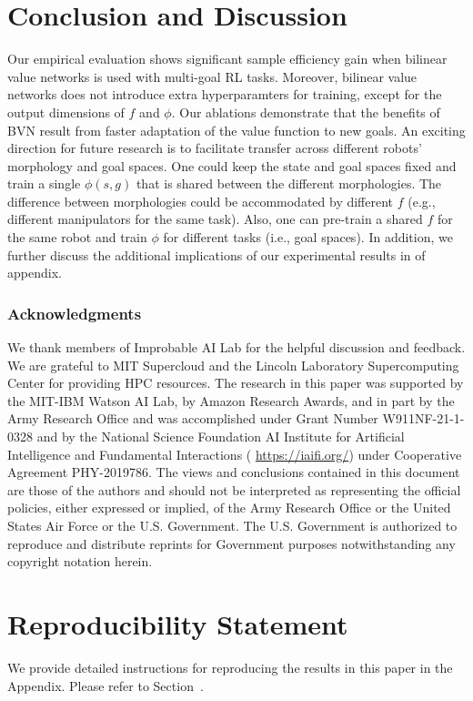 \documentclass[dvipsnames]{article} %
\theoremstyle{definition}
\theoremstyle{remark}
\begin{document}
\section{Conclusion and Discussion}

Our empirical evaluation shows significant sample efficiency gain when bilinear value networks is used with multi-goal RL tasks. Moreover, bilinear value networks does not introduce extra hyperparamters for training, except for the output dimensions of $f$ and $\phi$. Our ablations demonstrate that the benefits of BVN result from faster adaptation of the value function to new goals. An exciting direction for future research  is to facilitate transfer across different robots' morphology and goal spaces. One could keep the state and goal spaces fixed and train a single \(\phi(s, g)\) that is shared between the different morphologies. The difference between morphologies could be accommodated by different $f$ (e.g., different manipulators for the same task). Also, one can pre-train a shared $f$ for the same robot and train $\phi$ for different tasks (i.e., goal spaces). In addition, we further discuss the additional implications of our experimental results in  of appendix.



\subsubsection*{Acknowledgments}
We thank members of Improbable AI Lab for the helpful discussion and feedback. We are grateful to MIT Supercloud and the Lincoln Laboratory Supercomputing Center for providing HPC resources. The research in this paper was supported by the MIT-IBM Watson AI Lab, by Amazon Research Awards, and in part by the Army Research Office and was accomplished under Grant Number W911NF-21-1-0328 and by the National Science Foundation AI Institute for Artificial Intelligence and Fundamental Interactions ( \href{https://iaifi.org/}{https://iaifi.org/}) under Cooperative Agreement PHY-2019786.  The views and conclusions contained in this document are those of the authors and should not be interpreted as representing the official policies, either expressed or implied, of the Army Research Office or the United States Air Force or the U.S. Government. The U.S. Government is authorized to reproduce and distribute reprints for Government purposes notwithstanding any copyright notation herein.

\section{Reproducibility Statement}
We provide detailed instructions for reproducing the results in this paper in the Appendix. Please refer to Section~.
\end{document}
